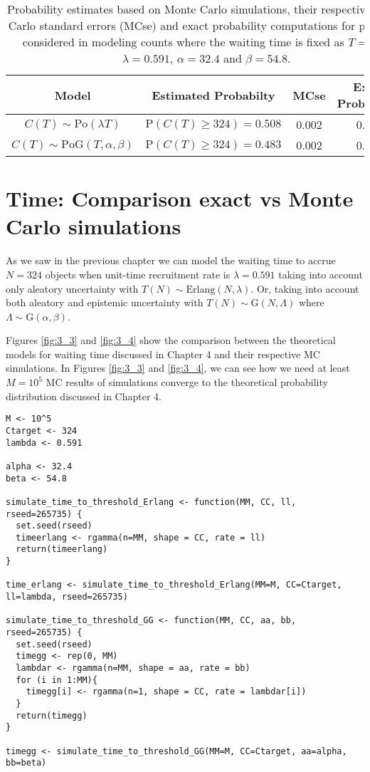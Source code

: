 \begin{table}[h!]
\centering
\begin{tabular}{cccc}
 \textbf{Model} & \textbf{Estimated Probabilty} & \textbf{MCse} & \textbf{Exact Probability} \\
\hline
\hline
 $C(T)\sim\textrm{Po}(\lambda T)$ & $\textrm{P}(C(T)\geq 324) = 0.508$ & 0.002 & 0.508 \\
 $C(T)\sim\textrm{PoG}(T, \alpha, \beta)$ & $\textrm{P}(C(T)\geq 324) = 0.483$ & 0.002 & 0.501 
\end{tabular}
\caption{Probability estimates based on Monte Carlo simulations, their respective Monte Carlo standard errors (MCse) and exact probability computations for processes considered in modeling counts where the waiting time is fixed as $T = 548$,  $\lambda = 0.591$, $\alpha = 32.4$ and $\beta = 54.8$.}
\label{tab:mcsec}
\end{table}


\section{Time: Comparison exact vs Monte Carlo simulations}


As we saw in the previous chapter we can model the waiting time to accrue $N = 324$ objects when unit-time recruitment rate is $\lambda = 0.591$ taking into account only aleatory uncertainty with $T(N)\sim \textrm{Erlang}(N,\lambda)$. Or, taking into account both aleatory and epistemic uncertainty with $T(N)\sim\textrm{G}(N, \Lambda)$ where $\Lambda\sim \textrm{G}(\alpha,\beta)$.


Figures \ref{fig:3_3} and \ref{fig:3_4} show the comparison between the theoretical models for waiting time discussed in Chapter 4 and their respective MC simulations. In Figures \ref{fig:3_3} and \ref{fig:3_4}, we can see how we need at least $M=10^5$ MC results of simulations converge to the theoretical probability distribution discussed in Chapter 4.


\begin{knitrout}
\color{fgcolor}\begin{kframe}
\begin{verbatim}
M <- 10^5
Ctarget <- 324
lambda <- 0.591

alpha <- 32.4
beta <- 54.8

simulate_time_to_threshold_Erlang <- function(MM, CC, ll, rseed=265735) {
  set.seed(rseed)
  timeerlang <- rgamma(n=MM, shape = CC, rate = ll)
  return(timeerlang)
}

time_erlang <- simulate_time_to_threshold_Erlang(MM=M, CC=Ctarget, ll=lambda, rseed=265735)

simulate_time_to_threshold_GG <- function(MM, CC, aa, bb, rseed=265735) {
  set.seed(rseed)
  timegg <- rep(0, MM)
  lambdar <- rgamma(n=MM, shape = aa, rate = bb)
  for (i in 1:MM){
    timegg[i] <- rgamma(n=1, shape = CC, rate = lambdar[i])
  }
  return(timegg)
}

timegg <- simulate_time_to_threshold_GG(MM=M, CC=Ctarget, aa=alpha, bb=beta) 
\end{verbatim}
\end{kframe}
\end{knitrout}

